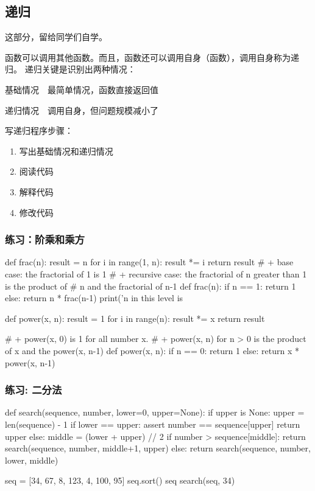 \subsection{递归}
这部分，留给同学们自学。

函数可以调用其他函数。而且，函数还可以调用自身（函数），调用自身称为递归。
递归关键是识别出两种情况：
\begin{description}
\item{基础情况}　最简单情况，函数直接返回值
\item{递归情况}　调用自身，但问题规模减小了
\end{description}
写递归程序步骤：
\begin{enumerate}
\item 写出基础情况和递归情况
\item 阅读代码
\item 解释代码
\item 修改代码
\end{enumerate}
\subsubsection{练习：阶乘和乘方}
\begin{python}
def frac(n):
    result = n
    for i in range(1, n):
        result *= i
    return result
# + base case: the fractorial of 1 is 1
# + recursive case: the fractorial of n greater than 1 is the product of
#  n and the fractorial of n-1
def frac(n):
    if n == 1:
        return 1
    else:
        return n * frac(n-1)
    print('n in this level is %

def power(x, n):
    result = 1
    for i in range(n):
        result *= x
    return result

# + power(x, 0) is 1 for all number x.
# + power(x, n) for n > 0 is the product of x and the power(x, n-1)
def power(x, n):
    if n == 0:
        return 1
    else:
        return x * power(x, n-1)
\end{python}

\subsubsection{练习: 二分法}
\begin{python}
def search(sequence, number, lower=0, upper=None):
    if upper is None:
        upper = len(sequence) - 1
    if lower == upper:
        assert number == sequence[upper]
        return upper
    else:
        middle = (lower + upper) // 2
        if number > sequence[middle]:
            return search(sequence, number, middle+1, upper)
        else:
            return search(sequence, number, lower, middle)

seq = [34, 67, 8, 123, 4, 100, 95]
seq.sort()
seq
search(seq, 34)
\end{python}

